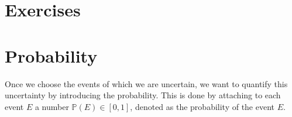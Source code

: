 \documentclass[reqno]{amsart}
\newcommand{\<}{{\langle \!\! \langle}}
\renewcommand{\>}{{\rangle \!\! \rangle}}
\begin{document}
%
%
%
%
%
%
%
%
%

\section{Exercises}

\section{Probability}

Once we choose the events of which we are uncertain, we want to quantify this uncertainty by introducing the probability. This is done by attaching to each event $E$ a number $\mathbb{P}(E)\in[0,1]$, denoted as the probability of the event $E$.
 
\end{document}

